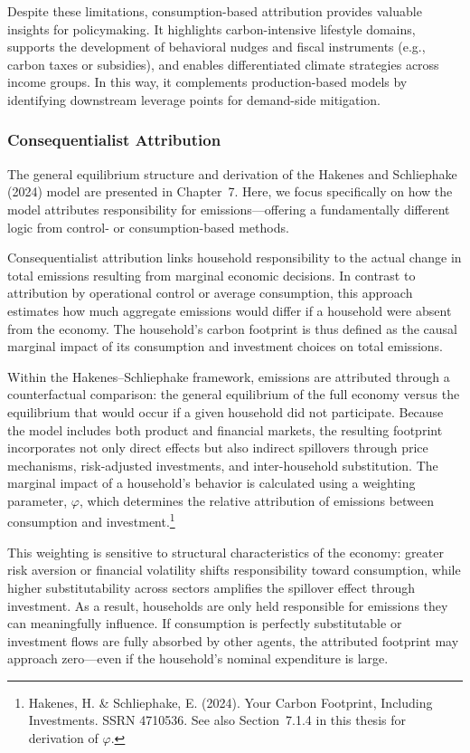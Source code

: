 \documentclass[12pt,a4paper]{article}%
\begin{document}
Despite these limitations, consumption-based attribution provides valuable insights for policymaking. It highlights carbon-intensive lifestyle domains, supports the development of behavioral nudges and fiscal instruments (e.g., carbon taxes or subsidies), and enables differentiated climate strategies across income groups. In this way, it complements production-based models by identifying downstream leverage points for demand-side mitigation.

\subsubsection{Consequentialist Attribution}

The general equilibrium structure and derivation of the Hakenes and Schliephake (2024) model are presented in Chapter~7. Here, we focus specifically on how the model attributes responsibility for emissions—offering a fundamentally different logic from control- or consumption-based methods.

Consequentialist attribution links household responsibility to the actual change in total emissions resulting from marginal economic decisions. In contrast to attribution by operational control or average consumption, this approach estimates how much aggregate emissions would differ if a household were absent from the economy. The household’s carbon footprint is thus defined as the causal marginal impact of its consumption and investment choices on total emissions.

Within the Hakenes–Schliephake framework, emissions are attributed through a counterfactual comparison: the general equilibrium of the full economy versus the equilibrium that would occur if a given household did not participate. Because the model includes both product and financial markets, the resulting footprint incorporates not only direct effects but also indirect spillovers through price mechanisms, risk-adjusted investments, and inter-household substitution. The marginal impact of a household’s behavior is calculated using a weighting parameter, $\varphi$, which determines the relative attribution of emissions between consumption and investment.\footnote{Hakenes, H. \& Schliephake, E. (2024). Your Carbon Footprint, Including Investments. SSRN 4710536. See also Section~7.1.4 in this thesis for derivation of $\varphi$.}

This weighting is sensitive to structural characteristics of the economy: greater risk aversion or financial volatility shifts responsibility toward consumption, while higher substitutability across sectors amplifies the spillover effect through investment. As a result, households are only held responsible for emissions they can meaningfully influence. If consumption is perfectly substitutable or investment flows are fully absorbed by other agents, the attributed footprint may approach zero—even if the household’s nominal expenditure is large.
\end{document}
